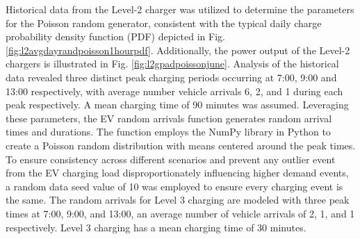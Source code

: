 \documentclass[conference]{IEEEtran}
\begin{document}
	Historical data from the Level-2 charger was utilized to determine the parameters for the Poisson random generator, consistent with the typical daily charge probability density function (PDF) depicted in Fig. \ref{fig:l2avgdayrandpoisson1hourpdf}. Additionally, the power output of the Level-2 chargers is illustrated in Fig. \ref{fig:l2gpadpoissonjune}. Analysis of the historical data revealed three distinct peak charging periods occurring at 7:00, 9:00 and  13:00 respectively, with average number vehicle arrivals 6, 2, and 1 during each peak respectively. A mean charging time of 90 minutes was assumed. Leveraging these parameters, the EV random arrivals function generates random arrival times and durations. The function employs the NumPy library\cite{NumPy}\cite{numpy.random.poisson-NumPyv1.26Manual} in Python to create a Poisson random distribution with means centered around the peak times. To ensure consistency across different scenarios and prevent any outlier event from the EV charging load disproportionately influencing higher demand events, a random data seed value of 10 was employed to ensure every charging event is the same. The random arrivals for Level 3 charging are modeled with three peak times at 7:00, 9:00, and 13:00, an average number of vehicle arrivals of 2, 1,  and 1  respectively. Level 3 charging has a mean charging time of 30 minutes.
\end{document}
